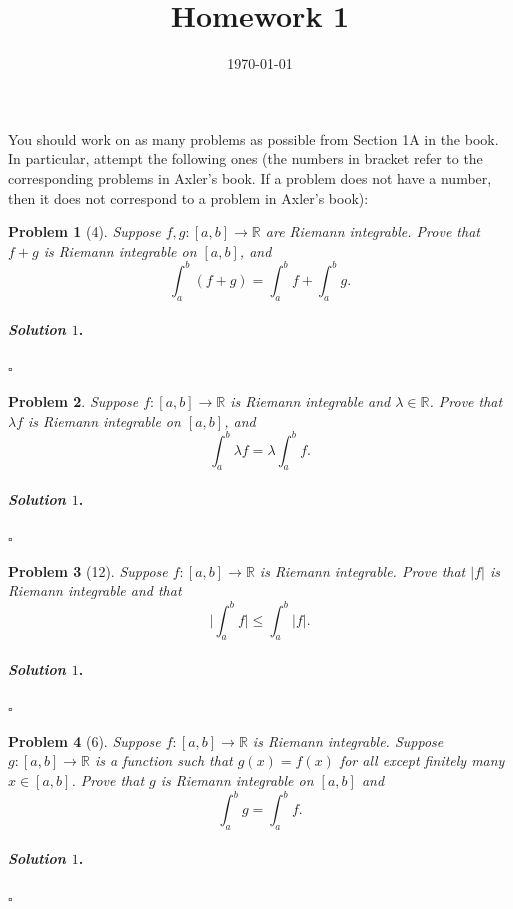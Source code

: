 \documentclass[reqno]{amsart}
\theoremstyle{plain}
\newtheorem{problem}{Problem}
\theoremstyle{definition}
\newenvironment{solution1}{\paragraph{\emph{Solution $1$}.}}{\hfill$\square$}
\begin{document}
 

\title[Homework 1]{Homework 1}

\date{\today} 
\maketitle 

You should work on as many problems as possible from Section 1A in the book.  In particular, attempt the following ones (the numbers in bracket refer to the corresponding problems in Axler's book.  If a problem does not have a number, then it does not correspond to a problem in Axler's book):



\begin{problem}[4]
Suppose $f,g:[a,b] \rightarrow \mathbb{R}$ are Riemann integrable.  Prove that $f+g$ is Riemann integrable on $[a,b]$, and
$$\int_{a}^{b}(f+g) = \int_{a}^{b}f + \int_{a}^{b} g. $$
\end{problem}
\begin{solution1}

\end{solution1}

\begin{problem}
Suppose $f:[a,b] \rightarrow \mathbb{R}$ is Riemann integrable and $\lambda \in \mathbb{R}$.  Prove that $\lambda f$ is Riemann integrable on $[a,b]$, and
$$\int_{a}^{b} \lambda f = \lambda \int_{a}^{b}f. $$
\end{problem}
\begin{solution1}

\end{solution1}

\begin{problem}[12]
Suppose $f:[a,b] \rightarrow \mathbb{R}$ is Riemann integrable.  Prove that $|f|$ is Riemann integrable and that
$$\Big| \int_{a}^{b}f\Big| \le \int_{a}^{b}|f|. $$
\end{problem}
\begin{solution1}

\end{solution1}

\begin{problem}[6]
Suppose $f:[a,b] \rightarrow \mathbb{R}$ is Riemann integrable.  Suppose $g:[a,b] \rightarrow \mathbb{R}$ is a function such that $g(x) = f(x)$ for all except finitely many $x \in [a,b]$.  Prove that $g$ is Riemann integrable on $[a,b]$ and
$$\int_{a}^{b}g = \int_{a}^{b}f. $$
\end{problem}
\begin{solution1}

\end{solution1}
\end{document}
